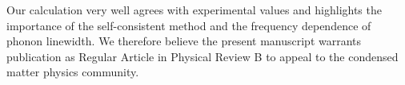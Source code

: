 \documentclass[12pt,a4paper, roman]{moderncv}        %
\begin{document}
\vspace{0.2cm}

Our calculation very well agrees with experimental values and highlights the importance of the self-consistent method and the frequency dependence of phonon linewidth. We therefore believe the present manuscript warrants publication as Regular Article in Physical Review B to appeal to the condensed matter physics community.

\vspace{0.3cm}

\makeletterclosing
\end{document}
